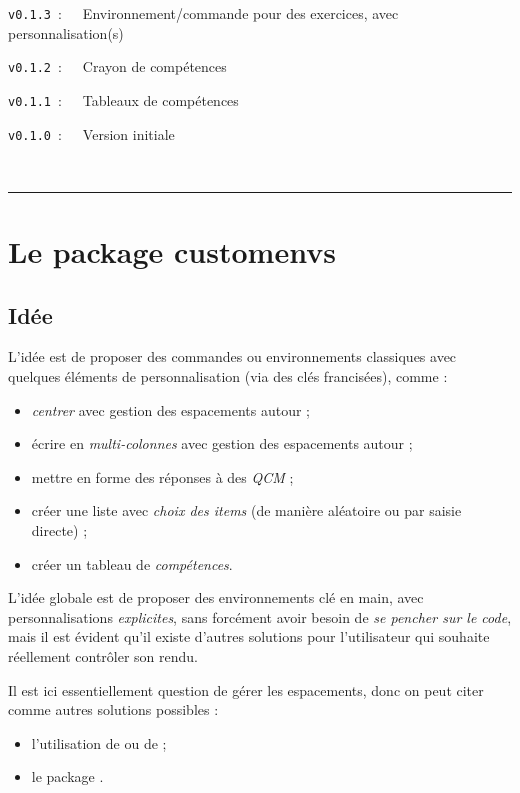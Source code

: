 \documentclass[french,11pt,a4paper]{article}
\begin{document}
\verb|v0.1.3|~:~~~Environnement/commande pour des exercices, avec personnalisation(s)

\verb|v0.1.2|~:~~~Crayon de compétences

\verb|v0.1.1|~:~~~Tableaux de compétences

\verb|v0.1.0|~:~~~Version initiale

~

\hrule

\pagebreak

\section{Le package customenvs}

\subsection{Idée}

L'idée est de proposer des commandes ou environnements classiques avec quelques éléments de personnalisation (via des \textsf{clés} francisées), comme :

\begin{itemize}
	\item \textit{centrer} avec gestion des espacements autour ;
	\item écrire en \textit{multi-colonnes} avec gestion des espacements autour ;
	\item mettre en forme des réponses à des \textit{QCM} ;
	\item créer une liste avec \textit{choix des items} (de manière aléatoire ou par saisie directe) ;
	\item créer un tableau de \textit{compétences}.
\end{itemize}

\smallskip

L'idée globale est de proposer des environnements clé en main, avec personnalisations \textit{explicites}, sans forcément avoir besoin de \textit{se pencher sur le code}, mais il est évident qu'il existe d'autres solutions pour l'utilisateur qui souhaite réellement contrôler son rendu.

\smallskip

Il est ici essentiellement question de gérer les espacements, donc on peut citer comme autres solutions possibles :

\begin{itemize}
	\item l'utilisation de  ou de  ;
	\item le package .
\end{itemize}
\end{document}
